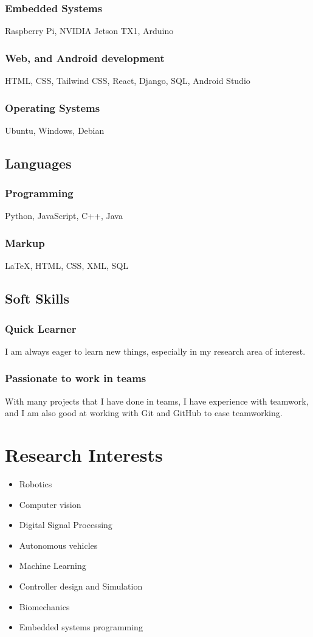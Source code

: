 \documentclass[a4paper]{article}
\begin{document}
\subsubsection{Embedded Systems}
Raspberry Pi, NVIDIA Jetson TX1, Arduino
\subsubsection{Web, and Android  development}
HTML, CSS, Tailwind CSS, React, Django, SQL, Android Studio
\subsubsection{Operating Systems}
Ubuntu, Windows, Debian
\subsection{Languages}
\subsubsection{Programming}
Python, JavaScript, C++, Java
\subsubsection{Markup}
{\LaTeX}, HTML, CSS, XML, SQL
\subsection{Soft Skills}
\subsubsection{Quick Learner}
I am always eager to learn new things, especially in my research area of interest.
\subsubsection{Passionate to work in teams}
With many projects that I have done in teams, I have experience with teamwork, and I am also good at working with Git and GitHub to ease teamworking.
\section{Research Interests}


\begin{multicols}{2}[]
    \begin{itemize}
        \itemsep0em 
        \item Robotics
        \item Computer vision
        \item Digital Signal Processing
        \item Autonomous vehicles
        \item Machine Learning
        \item Controller  design and Simulation
        \item Biomechanics
        \item Embedded systems programming
    \end{itemize}
\end{multicols}
\end{document}
